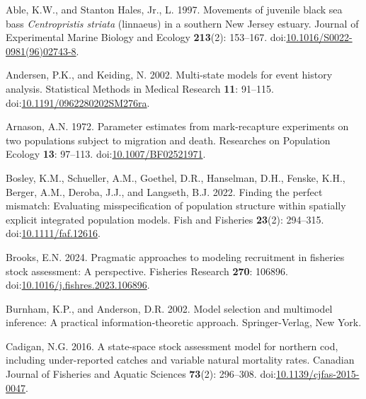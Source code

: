 \documentclass[
]{article}
\newlength{\cslhangindent}
\newlength{\cslentryspacingunit} %
\newenvironment{CSLReferences}[2] %
 {%
  \setlength{\parindent}{0pt}
  \ifodd #1
  \let\oldpar\par
  \def\par{\hangindent=\cslhangindent\oldpar}
  \fi
  \setlength{\parskip}{#2\cslentryspacingunit}
 }%
 {}
\begin{document}
\hypertarget{refs}{}
\begin{CSLReferences}{1}{0}
\leavevmode{}%
Able, K.W., and Stanton Hales, Jr., L. 1997. Movements of juvenile black
sea bass \emph{{C}entropristis striata} (linnaeus) in a southern {N}ew
{J}ersey estuary. Journal of Experimental Marine Biology and Ecology
\textbf{213}(2): 153--167.
doi:\href{https://doi.org/10.1016/S0022-0981(96)02743-8}{10.1016/S0022-0981(96)02743-8}.

\leavevmode{}%
Andersen, P.K., and Keiding, N. 2002. Multi-state models for event
history analysis. Statistical Methods in Medical Research \textbf{11}:
91--115.
doi:\href{https://doi.org/10.1191/0962280202SM276ra}{10.1191/0962280202SM276ra}.

\leavevmode{}%
Arnason, A.N. 1972. Parameter estimates from mark-recapture experiments
on two populations subject to migration and death. Researches on
Population Ecology \textbf{13}: 97--113.
doi:\href{https://doi.org/10.1007/BF02521971}{10.1007/BF02521971}.

\leavevmode{}%
Bosley, K.M., Schueller, A.M., Goethel, D.R., Hanselman, D.H., Fenske,
K.H., Berger, A.M., Deroba, J.J., and Langseth, B.J. 2022. Finding the
perfect mismatch: Evaluating misspecification of population structure
within spatially explicit integrated population models. Fish and
Fisheries \textbf{23}(2): 294--315.
doi:\href{https://doi.org/10.1111/faf.12616}{10.1111/faf.12616}.

\leavevmode{}%
Brooks, E.N. 2024. Pragmatic approaches to modeling recruitment in
fisheries stock assessment: A perspective. Fisheries Research
\textbf{270}: 106896.
doi:\href{https://doi.org/10.1016/j.fishres.2023.106896}{10.1016/j.fishres.2023.106896}.

\leavevmode{}%
Burnham, K.P., and Anderson, D.R. 2002. Model selection and multimodel
inference: A practical information-theoretic approach. Springer-Verlag,
New York.

\leavevmode{}%
Cadigan, N.G. 2016. A state-space stock assessment model for northern
cod, including under-reported catches and variable natural mortality
rates. Canadian Journal of Fisheries and Aquatic Sciences
\textbf{73}(2): 296--308.
doi:\href{https://doi.org/10.1139/cjfas-2015-0047}{10.1139/cjfas-2015-0047}.


\end{CSLReferences}
\end{document}
